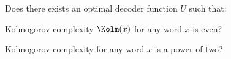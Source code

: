Does there exists an optimal decoder function $U$ such that:
\begin{enumlet}
    \item Kolmogorov complexity $\Kolm(x)$ for any word $x$ is even?
    \item Kolmogorov complexity for any word $x$ is a power of two?
\end{enumlet}